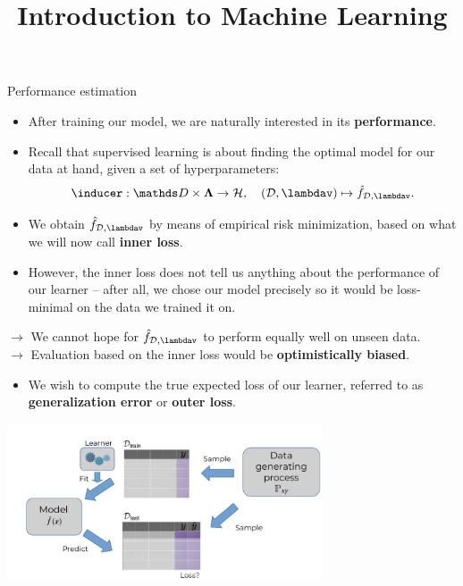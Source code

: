 \documentclass[11pt,compress,t,notes=noshow, xcolor=table]{beamer}
\title{Introduction to Machine Learning}
\institute{\href{https://compstat-lmu.github.io/lecture_i2ml/}{compstat-lmu.github.io/lecture\_i2ml}}
\date{}
\begin{document}








\begin{vbframe}{Performance estimation}

\begin{itemize}
  \item After training our model, we are naturally interested in its
  \textbf{performance}.
  \item Recall that supervised learning is about finding the optimal model 
  for our data at hand, given a set of hyperparameters: 
  $$\inducer: \preimageInducerShort \rightarrow \Hspace, \quad (\D, \lambdav)
  \mapsto \fh_{\D, \lambdav}.$$
  \item We obtain $\fh_{\D, \lambdav}$ by means of empirical risk minimization, 
  based on what we will now call \textbf{inner loss}.
  \item However, the inner loss does not tell us anything about the performance 
  of our learner -- after all, we chose our model precisely so it would be 
  loss-minimal on the data we trained it on.
\end{itemize}

\lz
$\rightarrow$ We cannot hope for $\fh_{\D, \lambdav}$ to perform equally well 
on unseen data. \\
$\rightarrow$ Evaluation based on the inner loss would be 
\textbf{optimistically biased}.

\framebreak

\begin{itemize}
  \item We wish to compute the true expected loss of our learner, referred to as
  \textbf{generalization error} or \textbf{outer loss}.
\end{itemize}

\begin{center}
\includegraphics[trim = 0 0 0 30, clip, width=0.7\textwidth]
{figure_man/evaluation-intro-ge.pdf}
\end{center}


\end{vbframe}
\end{document}
